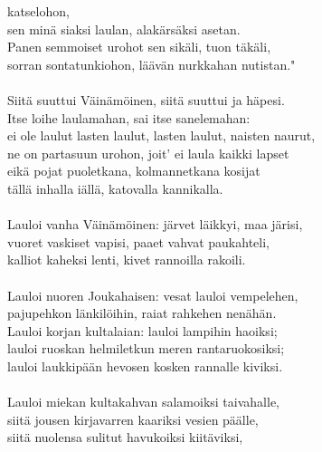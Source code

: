 katselohon,                                                   \\
sen minä siaksi laulan, alakärsäksi asetan.                   \\
Panen semmoiset urohot sen sikäli, tuon täkäli,               \\
sorran sontatunkiohon, läävän nurkkahan nutistan."            \\
                                                              \\
Siitä suuttui Väinämöinen, siitä suuttui ja häpesi.           \\
Itse loihe laulamahan, sai itse sanelemahan:                  \\
ei ole laulut lasten laulut, lasten laulut, naisten naurut,   \\
ne on partasuun urohon, joit' ei laula kaikki lapset          \\
eikä pojat puoletkana, kolmannetkana kosijat                  \\
tällä inhalla iällä, katovalla kannikalla.                    \\
                                                              \\
Lauloi vanha Väinämöinen: järvet läikkyi, maa järisi,         \\
vuoret vaskiset vapisi, paaet vahvat paukahteli,              \\
kalliot kaheksi lenti, kivet rannoilla rakoili.               \\
                                                              \\
Lauloi nuoren Joukahaisen: vesat lauloi vempelehen,           \\
pajupehkon länkilöihin, raiat rahkehen nenähän.               \\
Lauloi korjan kultalaian: lauloi lampihin haoiksi;            \\
lauloi ruoskan helmiletkun meren rantaruokosiksi;             \\
lauloi laukkipään hevosen kosken rannalle kiviksi.            \\
                                                              \\
Lauloi miekan kultakahvan salamoiksi taivahalle,              \\
siitä jousen kirjavarren kaariksi vesien päälle,              \\
siitä nuolensa sulitut havukoiksi kiitäviksi,                 \\
